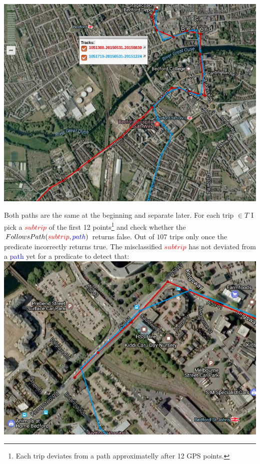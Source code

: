 \documentclass[12pt,a4paper,oneside,openright]{report}
\begin{document}
\includegraphics[scale = 0.6]{figs/similar_paths.png}

Both paths are the same at the beginning and separate later. For each
trip $\in T$ I pick a \textcolor{red}{$subtrip$} of the first 12
points\footnote{Each trip deviates from a path approximatelly after 12 GPS
points.} and check whether the
$FollowsPath(\textcolor{red}{subtrip}, \textcolor{blue}{path})$ 
returns false. Out of $107$ trips only once the predicate incorrectly returns
true. The misclassified \textcolor{red}{$subtrip$} has not deviated from a
\textcolor{blue}{path} yet for a predicate to detect that: \\

\includegraphics[scale = 0.6]{figs/misclassified_trip.png}
\end{document}

